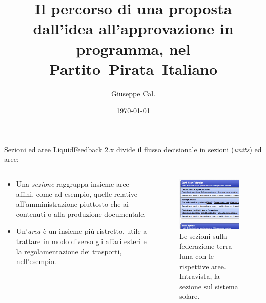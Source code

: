 \documentclass{beamer}
\title{Il percorso di una proposta dall'idea all'approvazione in programma, nel Partito~Pirata~Italiano}
\author{Giuseppe Cal.}
\institute{Partito Pirata Italiano -- Pirate Party of Italy}
\date{\today}
\begin{document}
\begin{frame}
\maketitle
\end{frame}

\begin{frame}{Sezioni ed aree}
LiquidFeedback 2.x divide il flusso decisionale in sezioni (\emph{units}) ed aree: 
\begin{columns}
\begin{column}{0.5\textwidth}
\begin{itemize}
\item Una \emph{sezione} raggruppa insieme aree affini, come ad esempio, quelle relative all'amministrazione piuttosto che ai contenuti o alla produzione documentale.
\item Un'\emph{area} \`e un insieme pi\`u ristretto, utile a trattare in modo diverso gli affari esteri e la regolamentazione dei trasporti, nell'esempio.
\end{itemize}
\end{column}
\begin{column}{0.5\textwidth}
\begin{figure}
\includegraphics[width=0.95\textwidth]{pics/unitarea}
\caption{Le sezioni sulla federazione terra luna con le rispettive aree. Intravista, la sezione sul sistema solare.}
\end{figure}
\end{column}
\end{columns}
\end{frame}
\end{document}
